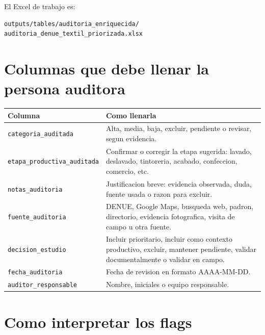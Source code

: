 \documentclass[11pt,letterpaper]{article}
\begin{document}
El Excel de trabajo es:

\begin{verbatim}
outputs/tables/auditoria_enriquecida/
auditoria_denue_textil_priorizada.xlsx
\end{verbatim}

\section{Columnas que debe llenar la persona auditora}

\begin{longtable}{p{4cm}p{10cm}}
\toprule
Columna & Como llenarla \\
\midrule
\texttt{categoria\_auditada} & Alta, media, baja, excluir, pendiente o revisar, segun evidencia. \\
\texttt{etapa\_productiva\_auditada} & Confirmar o corregir la etapa sugerida: lavado, deslavado, tintoreria, acabado, confeccion, comercio, etc. \\
\texttt{notas\_auditoria} & Justificacion breve: evidencia observada, duda, fuente usada o razon para excluir. \\
\texttt{fuente\_auditoria} & DENUE, Google Maps, busqueda web, padron, directorio, evidencia fotografica, visita de campo u otra fuente. \\
\texttt{decision\_estudio} & Incluir prioritario, incluir como contexto productivo, excluir, mantener pendiente, validar documentalmente o validar en campo. \\
\texttt{fecha\_auditoria} & Fecha de revision en formato AAAA-MM-DD. \\
\texttt{auditor\_responsable} & Nombre, iniciales o equipo responsable. \\
\bottomrule
\end{longtable}

\section{Como interpretar los flags}
\end{document}
